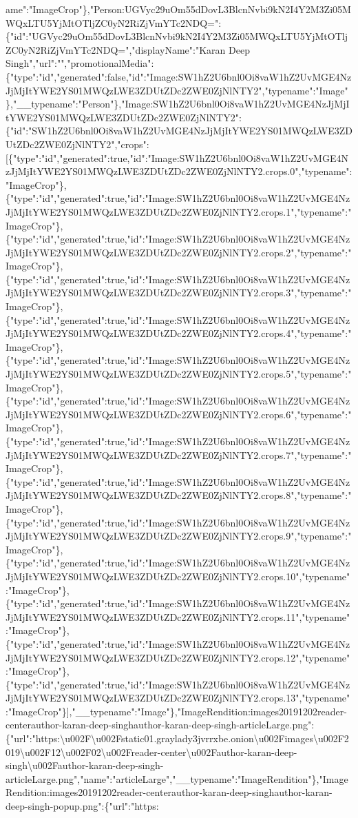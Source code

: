 ame":"ImageCrop"\},"Person:UGVyc29uOm55dDovL3BlcnNvbi9kN2I4Y2M3Zi05MWQxLTU5YjMtOTljZC0yN2RiZjVmYTc2NDQ=":\{"id":"UGVyc29uOm55dDovL3BlcnNvbi9kN2I4Y2M3Zi05MWQxLTU5YjMtOTljZC0yN2RiZjVmYTc2NDQ=","displayName":"Karan
Deep
Singh","url":"","promotionalMedia":\{"type":"id","generated":false,"id":"Image:SW1hZ2U6bnl0Oi8vaW1hZ2UvMGE4NzJjMjItYWE2YS01MWQzLWE3ZDUtZDc2ZWE0ZjNlNTY2","typename":"Image"\},"\_\_typename":"Person"\},"Image:SW1hZ2U6bnl0Oi8vaW1hZ2UvMGE4NzJjMjItYWE2YS01MWQzLWE3ZDUtZDc2ZWE0ZjNlNTY2":\{"id":"SW1hZ2U6bnl0Oi8vaW1hZ2UvMGE4NzJjMjItYWE2YS01MWQzLWE3ZDUtZDc2ZWE0ZjNlNTY2","crops":{[}\{"type":"id","generated":true,"id":"Image:SW1hZ2U6bnl0Oi8vaW1hZ2UvMGE4NzJjMjItYWE2YS01MWQzLWE3ZDUtZDc2ZWE0ZjNlNTY2.crops.0","typename":"ImageCrop"\},\{"type":"id","generated":true,"id":"Image:SW1hZ2U6bnl0Oi8vaW1hZ2UvMGE4NzJjMjItYWE2YS01MWQzLWE3ZDUtZDc2ZWE0ZjNlNTY2.crops.1","typename":"ImageCrop"\},\{"type":"id","generated":true,"id":"Image:SW1hZ2U6bnl0Oi8vaW1hZ2UvMGE4NzJjMjItYWE2YS01MWQzLWE3ZDUtZDc2ZWE0ZjNlNTY2.crops.2","typename":"ImageCrop"\},\{"type":"id","generated":true,"id":"Image:SW1hZ2U6bnl0Oi8vaW1hZ2UvMGE4NzJjMjItYWE2YS01MWQzLWE3ZDUtZDc2ZWE0ZjNlNTY2.crops.3","typename":"ImageCrop"\},\{"type":"id","generated":true,"id":"Image:SW1hZ2U6bnl0Oi8vaW1hZ2UvMGE4NzJjMjItYWE2YS01MWQzLWE3ZDUtZDc2ZWE0ZjNlNTY2.crops.4","typename":"ImageCrop"\},\{"type":"id","generated":true,"id":"Image:SW1hZ2U6bnl0Oi8vaW1hZ2UvMGE4NzJjMjItYWE2YS01MWQzLWE3ZDUtZDc2ZWE0ZjNlNTY2.crops.5","typename":"ImageCrop"\},\{"type":"id","generated":true,"id":"Image:SW1hZ2U6bnl0Oi8vaW1hZ2UvMGE4NzJjMjItYWE2YS01MWQzLWE3ZDUtZDc2ZWE0ZjNlNTY2.crops.6","typename":"ImageCrop"\},\{"type":"id","generated":true,"id":"Image:SW1hZ2U6bnl0Oi8vaW1hZ2UvMGE4NzJjMjItYWE2YS01MWQzLWE3ZDUtZDc2ZWE0ZjNlNTY2.crops.7","typename":"ImageCrop"\},\{"type":"id","generated":true,"id":"Image:SW1hZ2U6bnl0Oi8vaW1hZ2UvMGE4NzJjMjItYWE2YS01MWQzLWE3ZDUtZDc2ZWE0ZjNlNTY2.crops.8","typename":"ImageCrop"\},\{"type":"id","generated":true,"id":"Image:SW1hZ2U6bnl0Oi8vaW1hZ2UvMGE4NzJjMjItYWE2YS01MWQzLWE3ZDUtZDc2ZWE0ZjNlNTY2.crops.9","typename":"ImageCrop"\},\{"type":"id","generated":true,"id":"Image:SW1hZ2U6bnl0Oi8vaW1hZ2UvMGE4NzJjMjItYWE2YS01MWQzLWE3ZDUtZDc2ZWE0ZjNlNTY2.crops.10","typename":"ImageCrop"\},\{"type":"id","generated":true,"id":"Image:SW1hZ2U6bnl0Oi8vaW1hZ2UvMGE4NzJjMjItYWE2YS01MWQzLWE3ZDUtZDc2ZWE0ZjNlNTY2.crops.11","typename":"ImageCrop"\},\{"type":"id","generated":true,"id":"Image:SW1hZ2U6bnl0Oi8vaW1hZ2UvMGE4NzJjMjItYWE2YS01MWQzLWE3ZDUtZDc2ZWE0ZjNlNTY2.crops.12","typename":"ImageCrop"\},\{"type":"id","generated":true,"id":"Image:SW1hZ2U6bnl0Oi8vaW1hZ2UvMGE4NzJjMjItYWE2YS01MWQzLWE3ZDUtZDc2ZWE0ZjNlNTY2.crops.13","typename":"ImageCrop"\}{]},"\_\_typename":"Image"\},"ImageRendition:images20191202reader-centerauthor-karan-deep-singhauthor-karan-deep-singh-articleLarge.png":\{"url":"https:\textbackslash{}u002F\textbackslash{}u002Fstatic01.graylady3jvrrxbe.onion\textbackslash{}u002Fimages\textbackslash{}u002F2019\textbackslash{}u002F12\textbackslash{}u002F02\textbackslash{}u002Freader-center\textbackslash{}u002Fauthor-karan-deep-singh\textbackslash{}u002Fauthor-karan-deep-singh-articleLarge.png","name":"articleLarge","\_\_typename":"ImageRendition"\},"ImageRendition:images20191202reader-centerauthor-karan-deep-singhauthor-karan-deep-singh-popup.png":\{"url":"https:\textb